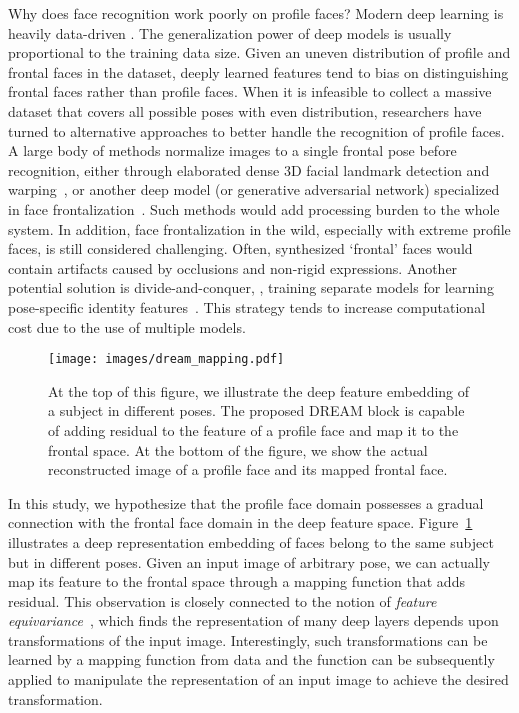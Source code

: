 \documentclass[10pt,twocolumn,letterpaper]{article}
\begin{document}
Why does face recognition work poorly on profile faces? Modern deep learning is heavily data-driven \cite{huang2016learning,guo2016ms}. The generalization power of deep models is usually proportional to the training data size. Given an uneven distribution of profile and frontal faces in the dataset, deeply learned features tend to bias on distinguishing frontal faces rather than profile faces.
When it is infeasible to collect a massive dataset that covers all possible poses with even distribution, researchers have turned to alternative approaches to better handle the recognition of profile faces. 
A large body of methods normalize images to a single frontal pose before recognition, either through elaborated dense 3D facial landmark detection and warping~\cite{taigman2014deepface}, or another deep model (or generative adversarial network) specialized in face frontalization~\cite{tran2017disentangled}. Such methods would add processing burden to the whole system. In addition, face frontalization in the wild, especially with extreme profile faces, is still considered challenging. Often, synthesized `frontal' faces would contain artifacts caused by occlusions and non-rigid expressions. Another potential solution is divide-and-conquer, \ie, training separate models for learning pose-specific identity features~\cite{masi2016pose}. This strategy tends to increase computational cost due to the use of multiple models.





\begin{figure}[t]
\begin{center}
\texttt{[image: images/dream\_mapping.pdf]}
\caption{At the top of this figure, we illustrate the deep feature embedding of a subject in different poses. The proposed DREAM block is capable of adding residual to the feature of a profile face and map it to the frontal space. At the bottom of the figure, we show the actual reconstructed image of a profile face and its mapped frontal face.}
\label{fig:dream_mapping}
\end{center}
\vspace{-0.25cm}
\vskip -0.5cm
\end{figure}

In this study, we hypothesize that the profile face domain possesses a gradual connection with the frontal face domain in the deep feature space.
Figure~\ref{fig:dream_mapping} illustrates a deep representation embedding of faces belong to the same subject but in different poses.
Given an input image of arbitrary pose, we can actually map its feature to the frontal space through a mapping function that adds residual.
This observation is closely connected to the notion of \textit{feature equivariance}~\cite{lenc2015understanding}, which finds the representation of many deep layers depends upon transformations of the input image. Interestingly, such transformations can be learned by a mapping function from data and the function can be subsequently applied to manipulate the representation of an input image to achieve the desired transformation.
\end{document}
